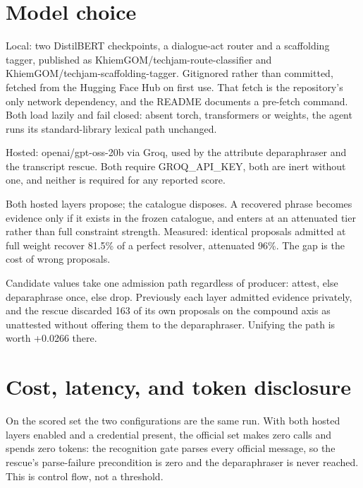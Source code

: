\documentclass[11pt,a4paper]{article}
\begin{document}
\section{Model choice}
Local: two DistilBERT checkpoints, a dialogue-act router and a scaffolding tagger, published as KhiemGOM/techjam-route-classifier and KhiemGOM/techjam-scaffolding-tagger. Gitignored rather than committed, fetched from the Hugging Face Hub on first use. That fetch is the repository's only network dependency, and the README documents a pre-fetch command. Both load lazily and fail closed: absent torch, transformers or weights, the agent runs its standard-library lexical path unchanged.

Hosted: openai/gpt-oss-20b via Groq, used by the attribute deparaphraser and the transcript rescue. Both require GROQ\_API\_KEY, both are inert without one, and neither is required for any reported score.

Both hosted layers propose; the catalogue disposes. A recovered phrase becomes evidence only if it exists in the frozen catalogue, and enters at an attenuated tier rather than full constraint strength. Measured: identical proposals admitted at full weight recover 81.5\% of a perfect resolver, attenuated 96\%. The gap is the cost of wrong proposals.

Candidate values take one admission path regardless of producer: attest, else deparaphrase once, else drop. Previously each layer admitted evidence privately, and the rescue discarded 163 of its own proposals on the compound axis as unattested without offering them to the deparaphraser. Unifying the path is worth +0.0266 there.

\section{Cost, latency, and token disclosure}
On the scored set the two configurations are the same run. With both hosted layers enabled and a credential present, the official set makes zero calls and spends zero tokens: the recognition gate parses every official message, so the rescue's parse-failure precondition is zero and the deparaphraser is never reached. This is control flow, not a threshold.
\end{document}
